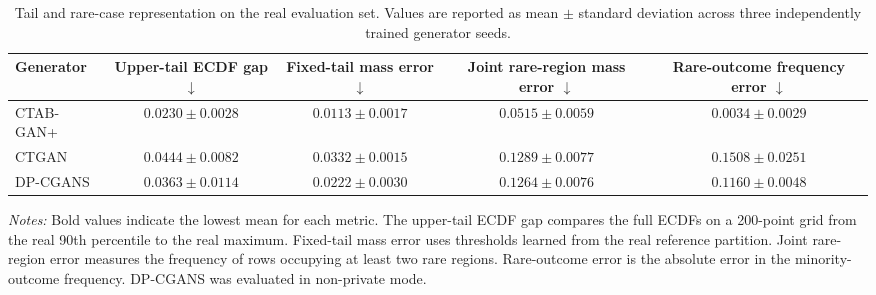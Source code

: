 \begin{table}[htbp]
    \centering
    \caption{Tail and rare-case representation on the real evaluation set.
    Values are reported as mean $\pm$ standard deviation across three
    independently trained generator seeds.}
    \label{tab:rq1_tail_comparison}
    \small
    \setlength{\tabcolsep}{4pt}
    \begin{tabular}{lcccc}
        \toprule
        Generator
            & \shortstack{Upper-tail\\ECDF gap $\downarrow$}
            & \shortstack{Fixed-tail\\mass error $\downarrow$}
            & \shortstack{Joint rare-region\\mass error $\downarrow$}
            & \shortstack{Rare-outcome\\frequency error $\downarrow$} \\
        \midrule
        CTAB-GAN+
            & $\mathbf{0.0230 \pm 0.0028}$
            & $\mathbf{0.0113 \pm 0.0017}$
            & $\mathbf{0.0515 \pm 0.0059}$
            & $\mathbf{0.0034 \pm 0.0029}$ \\
        CTGAN
            & $0.0444 \pm 0.0082$
            & $0.0332 \pm 0.0015$
            & $0.1289 \pm 0.0077$
            & $0.1508 \pm 0.0251$ \\
        DP-CGANS
            & $0.0363 \pm 0.0114$
            & $0.0222 \pm 0.0030$
            & $0.1264 \pm 0.0076$
            & $0.1160 \pm 0.0048$ \\
        \bottomrule
    \end{tabular}

    \vspace{2mm}
    \begin{minipage}{0.96\linewidth}
        \footnotesize
        \textit{Notes:} Bold values indicate the lowest mean for each metric.
        The upper-tail ECDF gap compares the full ECDFs on a 200-point grid
        from the real 90th percentile to the real maximum. Fixed-tail mass
        error uses thresholds learned from the real reference partition. Joint
        rare-region error measures the frequency of rows occupying at least
        two rare regions. Rare-outcome error is the absolute error in the
        minority-outcome frequency. DP-CGANS was evaluated in non-private mode.
    \end{minipage}
\end{table}
